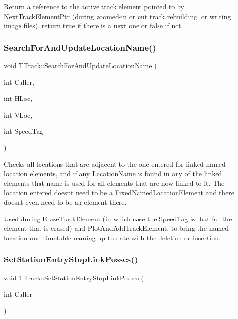 Return a reference to the active track element pointed to by Next\+Track\+Element\+Ptr (during zoomed-\/in or out track rebuilding, or writing image files), return true if there is a next one or false if not \mbox{\label{class_t_track_a68519138e3b39b6ab9433cc9f7862c64}} 
\subsubsection{\texorpdfstring{Search\+For\+And\+Update\+Location\+Name()}{SearchForAndUpdateLocationName()}}
{\footnotesize\ttfamily void T\+Track\+::\+Search\+For\+And\+Update\+Location\+Name (\begin{DoxyParamCaption}\item[{int}]{Caller,  }\item[{int}]{H\+Loc,  }\item[{int}]{V\+Loc,  }\item[{int}]{Speed\+Tag }\end{DoxyParamCaption})}

Checks all locations that are adjacent to the one entered for linked named location elements, and if any Location\+Name is found in any of the linked elements that name is used for all elements that are now linked to it. The location entered doesn\textquotesingle{}t need to be a Fixed\+Named\+Location\+Element and there doesn\textquotesingle{}t even need to be an element there.

Used during Erase\+Track\+Element (in which case the Speed\+Tag is that for the element that is erased) and Plot\+And\+Add\+Track\+Element, to bring the named location and timetable naming up to date with the deletion or insertion. \mbox{\label{class_t_track_a46b69ee08436c2ff5e41673df04bcf11}} 
\subsubsection{\texorpdfstring{Set\+Station\+Entry\+Stop\+Link\+Posses()}{SetStationEntryStopLinkPosses()}}
{\footnotesize\ttfamily void T\+Track\+::\+Set\+Station\+Entry\+Stop\+Link\+Posses (\begin{DoxyParamCaption}\item[{int}]{Caller }\end{DoxyParamCaption})}

